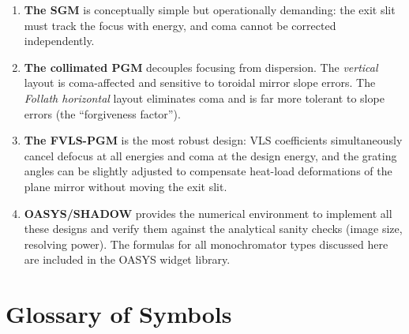 \documentclass[12pt,a4paper]{article}
\begin{document}
\begin{enumerate}[leftmargin=*, label=\arabic*.]
  \item \textbf{The SGM} is conceptually simple but operationally demanding: the exit slit
        must track the focus with energy, and coma cannot be corrected independently.

  \item \textbf{The collimated PGM} decouples focusing from dispersion.  The
        \emph{vertical} layout is coma-affected and sensitive to toroidal mirror slope
        errors.  The \emph{Follath horizontal} layout eliminates coma and is far more
        tolerant to slope errors (the ``forgiveness factor'').

  \item \textbf{The FVLS-PGM} is the most robust design: VLS coefficients simultaneously
        cancel defocus at all energies and coma at the design energy, and the grating
        angles can be slightly adjusted to compensate heat-load deformations of the plane
        mirror without moving the exit slit.

  \item \textbf{OASYS/SHADOW} provides the numerical environment to implement all these
        designs and verify them against the analytical sanity checks (image size,
        resolving power).  The formulas for all monochromator types discussed here are
        included in the OASYS widget library.
\end{enumerate}

\newpage
\appendix
\section*{Glossary of Symbols}
\end{document}
